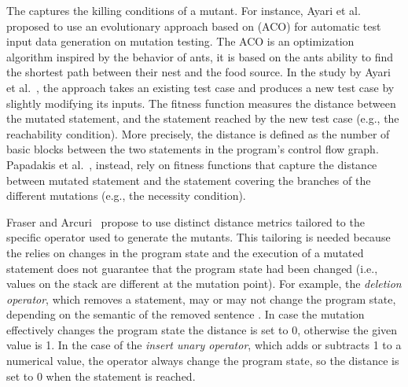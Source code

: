 The  captures the killing conditions of a mutant. For instance, Ayari et al.~\cite{ayari2007automatic} proposed to use an evolutionary approach based on  (ACO) for automatic test input data generation on mutation testing. The ACO is an optimization algorithm inspired by the behavior of ants, it is based on the ants ability to find the shortest path between their nest and the food source. In the study by Ayari et al.~\cite{ayari2007automatic}, the approach takes an existing test case and produces a new test case by slightly modifying its inputs. 
The fitness function measures the distance between the mutated statement, and the statement reached by the new test case (e.g., the reachability condition). More precisely, the distance is defined as the number of basic blocks between the two statements in the program's control flow graph.
Papadakis et al.~\cite{papadakis2011automatically}, instead, rely on fitness functions that capture the distance between mutated statement and the statement covering the branches of the different mutations (e.g., the necessity condition).

Fraser and Arcuri~\cite{fraser2015achieving} propose to use distinct distance metrics tailored to the specific operator used to generate the mutants.
This tailoring is needed because the  relies on changes in the program state and the execution of a mutated statement does not guarantee that the program state had been changed (i.e., values on the stack are different at the mutation point).
For example, the \textit{deletion operator}, which removes a statement, may or may not change the program state, depending on the semantic of the removed sentence . In case the mutation effectively changes the program state the distance is set to 0, otherwise the given value is 1.
In the case of the \textit{insert unary operator}, which adds or subtracts 1 to a numerical value, the operator always change the program state, so the distance is set to 0 when the statement is reached. 

